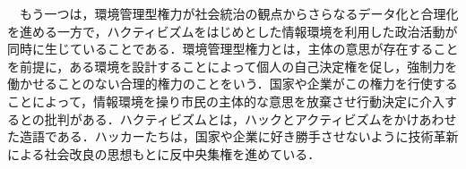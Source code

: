 \documentclass[uplatex,twocolumn,dvipdfmx]{jsarticle}
\begin{document}
　もう一つは，環境管理型権力が社会統治の観点からさらなるデータ化と合理化を進める一方で，ハクティビズムをはじめとした情報環境を利用した政治活動が同時に生じていることである．環境管理型権力とは，主体の意思が存在することを前提に，ある環境を設計することによって個人の自己決定権を促し，強制力を働かせることのない合理的権力のことをいう．国家や企業がこの権力を行使することによって，情報環境を操り市民の主体的な意思を放棄させ行動決定に介入するとの批判がある．ハクティビズムとは，ハックとアクティビズムをかけあわせた造語である．ハッカーたちは，国家や企業に好き勝手させないように技術革新による社会改良の思想もとに反中央集権を進めている．





\end{document}
